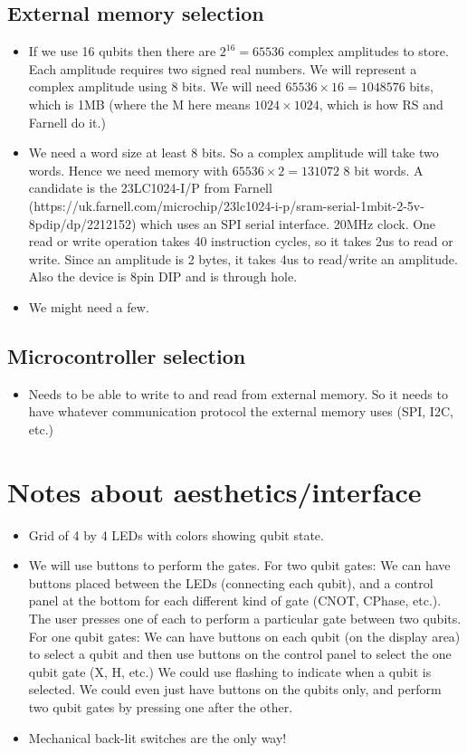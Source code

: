 \documentclass{article}
\begin{document}
\subsection{External memory selection}

\begin{itemize}
\item If we use 16 qubits then there are $2^{16} = 65536$ complex amplitudes to store. Each amplitude requires two signed real numbers. We will represent a complex amplitude using 8 bits. We will need $65536 \times 16 = 1048576$ bits, which is 1MB (where the M here means $1024 \times 1024$, which is how RS and Farnell do it.)
\item We need a word size at least 8 bits. So a complex amplitude will take two words. Hence we need memory with $65536 \times 2 = 131072$ 8 bit words. A candidate is the 23LC1024-I/P from Farnell (https://uk.farnell.com/microchip/23lc1024-i-p/sram-serial-1mbit-2-5v-8pdip/dp/2212152) which uses an SPI serial interface. 20MHz clock. One read or write operation takes 40 instruction cycles, so it takes 2us to read or write. Since an amplitude is 2 bytes, it takes 4us to read/write an amplitude. Also the device is 8pin DIP and is through hole.
\item We might need a few.
\end{itemize}


\subsection{Microcontroller selection}

\begin{itemize}
\item Needs to be able to write to and read from external memory. So it needs to have whatever communication protocol the external memory uses (SPI, I2C, etc.)
\end{itemize}

\section{Notes about aesthetics/interface}
\begin{itemize}
\item Grid of 4 by 4 LEDs with colors showing qubit state.
\item We will use buttons to perform the gates. For two qubit gates: We can have buttons placed between the LEDs (connecting each qubit), and a control panel at the bottom for each different kind of gate (CNOT, CPhase, etc.). The user presses one of each to perform a particular gate between two qubits. For one qubit gates: We can have buttons on each qubit (on the display area) to select a qubit and then use buttons on the control panel to select the one qubit gate (X, H, etc.) We could use flashing to indicate when a qubit is selected. We could even just have buttons on the qubits only, and perform two qubit gates by pressing one after the other.
\item Mechanical back-lit switches are the only way!
\end{itemize}

\end{document}
